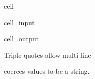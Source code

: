 \documentclass[letterpaper,10pt,english]{jupyterBook}
\begin{document}
\begin{sphinxuseclass}{cell}\begin{sphinxVerbatimInput}

\begin{sphinxuseclass}{cell_input}
\begin{sphinxVerbatim}[commandchars=\\\{\}]
\end{sphinxVerbatim}

\end{sphinxuseclass}\end{sphinxVerbatimInput}
\begin{sphinxVerbatimOutput}

\begin{sphinxuseclass}{cell_output}
\begin{sphinxVerbatim}[commandchars=\\\{\}]
Triple
quotes
allow
multi
line
\end{sphinxVerbatim}

\end{sphinxuseclass}\end{sphinxVerbatimOutput}

\end{sphinxuseclass}
\sphinxAtStartPar
{} coerces values to be a string.
\end{document}
